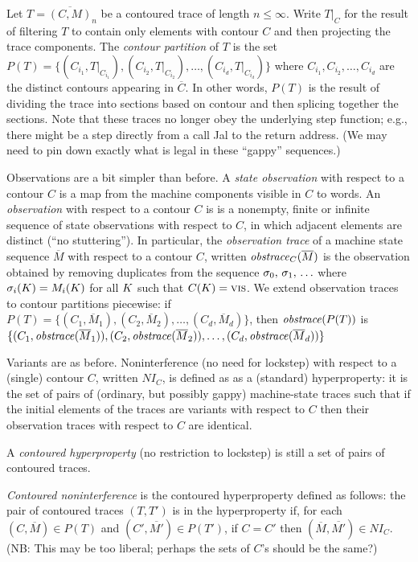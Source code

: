 \documentclass[conference]{IEEEtran}
\begin{document}
  Let $T = \overline{(C,M)}_n$ be a contoured trace of length $n \leq \infty$.
  Write $T\vert_C$ for the result of
  filtering $T$ to contain only elements with contour $C$ and
  then projecting the trace components.
  The \emph{contour partition} of $T$ is the set
  $P(T) = \{(C_{i_1},T\vert_{C_{i_1}}),
  (C_{i_2},T\vert_{C_{i_2}}),
  \ldots,(C_{i_d},T\vert_{C_{i_d}})\}$ where
  $C_{i_1},C_{i_2},\ldots,C_{i_d}$ are the distinct contours appearing in $\overline{C}$.
  In other words, $P(T)$ is the result of dividing the trace into sections based on contour and then splicing together the sections. Note that these traces no longer obey the underlying step function; e.g., there might be a step directly from a call Jal to the return address. (We may need to pin down exactly what is legal in these ``gappy'' sequences.)

  Observations are a bit simpler than before.
  A \emph{state observation} with respect to a contour $C$ is a map from
  the machine components visible in $C$ to words.
  An \emph{observation} with respect to a contour $C$ is
  is a nonempty, finite or infinite sequence of
  state observations with respect to $C$, in which adjacent elements
  are distinct (``no stuttering'').
  In particular, the \emph{observation trace} of
  a machine state sequence $\overline{M}$ with respect to a contour $C$,
  written $\mathit{obstrace}_C(\overline{M})$ is the observation
  obtained by removing duplicates from the sequence
  $\sigma_0,\, \sigma_1,\, \ldots$ where
  $\sigma_i(K) = M_i(K)$ for all $K$ such that $C(K) = \textsc{vis}$.
  We extend observation traces to contour partitions piecewise:
  if $P(T) = \{(C_1,\overline{M}_1),(C_2,\overline{M}_2),\ldots,(C_d,\overline{M}_d)\}$, then $\mathit{obstrace}(P(T))$ is $\{(C_1,\mathit{obstrace}(\overline{M}_1)),
  (C_2,\mathit{obstrace}(\overline{M}_2)),\ldots,(C_d,\mathit{obstrace}(\overline{M}_d))\}$


  Variants are as before.
  Noninterference (no need for lockstep) with respect to a (single)
  contour $C$, written $NI_C$, is defined as as a (standard) hyperproperty: it is the set of pairs of (ordinary, but possibly gappy) machine-state traces such that if the initial elements of the traces are variants with respect to $C$ then their observation traces with respect to $C$ are identical.

  A \emph{contoured hyperproperty} (no restriction to lockstep) is still a set of pairs of contoured traces.

  \emph{Contoured noninterference} is the contoured hyperproperty defined as follows: the pair of contoured traces $(T,T')$ is in the hyperproperty if,
  for each $(C,\overline{M}) \in P(T)$ and $(C',\overline{M'}  ) \in P(T')$,
  if $C = C'$ then $(\overline{M},\overline{M'}) \in NI_{C}$. (NB: This may
  be too liberal; perhaps the sets of $C$'s should be the same?)
\end{document}
